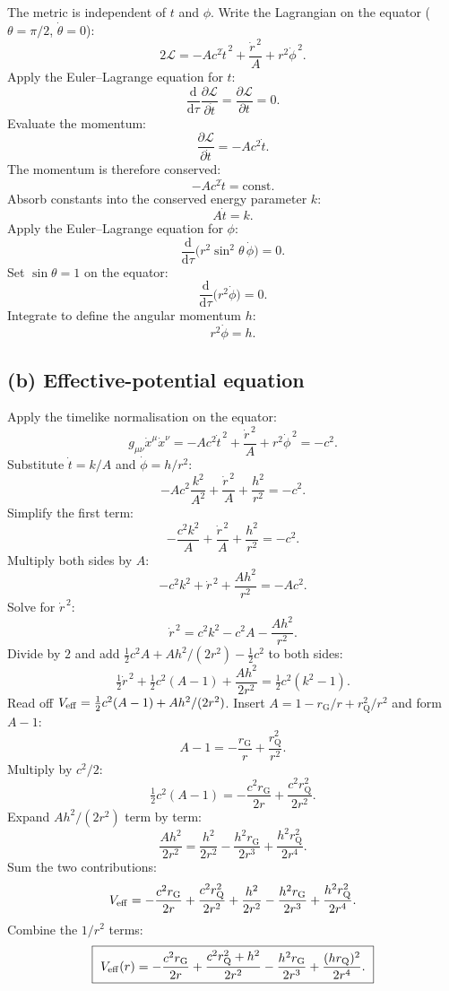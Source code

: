 \documentclass[11pt]{article}
\newcommand{\de}{\mathrm{d}}
\newcommand{\rG}{r_{\mathrm{G}}}
\newcommand{\rQ}{r_{\mathrm{Q}}}
\begin{document}
The metric is independent of $t$ and $\phi$. Write the Lagrangian on the equator ($\theta=\pi/2$, $\dot\theta=0$):
\[
2\mathcal L=-Ac^2\dot t^{\,2}+\frac{\dot r^{\,2}}{A}+r^2\dot\phi^{\,2}.
\]
Apply the Euler--Lagrange equation for $t$:
\[
\frac{\de}{\de\tau}\frac{\partial \mathcal L}{\partial \dot t}=\frac{\partial\mathcal L}{\partial t}=0.
\]
Evaluate the momentum:
\[
\frac{\partial\mathcal L}{\partial\dot t}=-Ac^2\dot t.
\]
The momentum is therefore conserved:
\[
-Ac^2\dot t=\text{const}.
\]
Absorb constants into the conserved energy parameter $k$:
\begin{equation}
\boxed{\ A\dot t=k.\ }
\label{eq:k}
\end{equation}
Apply the Euler--Lagrange equation for $\phi$:
\[
\frac{\de}{\de\tau}\bigl(r^2\sin^2\theta\,\dot\phi\bigr)=0.
\]
Set $\sin\theta=1$ on the equator:
\[
\frac{\de}{\de\tau}\bigl(r^2\dot\phi\bigr)=0.
\]
Integrate to define the angular momentum $h$:
\begin{equation}
\boxed{\ r^2\dot\phi=h.\ }
\label{eq:h}
\end{equation}

\subsection*{(b) Effective-potential equation}

Apply the timelike normalisation on the equator:
\[
g_{\mu\nu}\dot x^\mu\dot x^\nu=-Ac^2\dot t^{\,2}+\frac{\dot r^{\,2}}{A}+r^2\dot\phi^{\,2}=-c^2.
\]
Substitute $\dot t=k/A$ and $\dot\phi=h/r^2$:
\[
-Ac^2\frac{k^2}{A^2}+\frac{\dot r^{\,2}}{A}+\frac{h^2}{r^2}=-c^2.
\]
Simplify the first term:
\[
-\frac{c^2k^2}{A}+\frac{\dot r^{\,2}}{A}+\frac{h^2}{r^2}=-c^2.
\]
Multiply both sides by $A$:
\[
-c^2k^2+\dot r^{\,2}+\frac{Ah^2}{r^2}=-Ac^2.
\]
Solve for $\dot r^{\,2}$:
\[
\dot r^{\,2}=c^2k^2-c^2A-\frac{Ah^2}{r^2}.
\]
Divide by $2$ and add $\tfrac12 c^2 A+Ah^2/(2r^2)-\tfrac12 c^2$ to both sides:
\[
\tfrac12 \dot r^{\,2}+\tfrac12 c^2(A-1)+\frac{Ah^2}{2r^2}=\tfrac12 c^2(k^2-1).
\]
Read off $V_{\rm eff}=\tfrac12 c^2(A-1)+Ah^2/(2r^2)$. Insert $A=1-\rG/r+\rQ^2/r^2$ and form $A-1$:
\[
A-1=-\frac{\rG}{r}+\frac{\rQ^2}{r^2}.
\]
Multiply by $c^2/2$:
\[
\tfrac12 c^2(A-1)=-\frac{c^2\rG}{2r}+\frac{c^2\rQ^2}{2r^2}.
\]
Expand $Ah^2/(2r^2)$ term by term:
\[
\frac{Ah^2}{2r^2}=\frac{h^2}{2r^2}-\frac{h^2\rG}{2r^3}+\frac{h^2\rQ^2}{2r^4}.
\]
Sum the two contributions:
\[
V_{\rm eff}=-\frac{c^2\rG}{2r}+\frac{c^2\rQ^2}{2r^2}+\frac{h^2}{2r^2}-\frac{h^2\rG}{2r^3}+\frac{h^2\rQ^2}{2r^4}.
\]
Combine the $1/r^2$ terms:
\begin{equation}
\boxed{\ V_{\rm eff}(r)=-\frac{c^2\rG}{2r}+\frac{c^2\rQ^2+h^2}{2r^2}-\frac{h^2\rG}{2r^3}+\frac{(h\rQ)^2}{2r^4}.\ }
\label{eq:Veff}
\end{equation}
\end{document}
